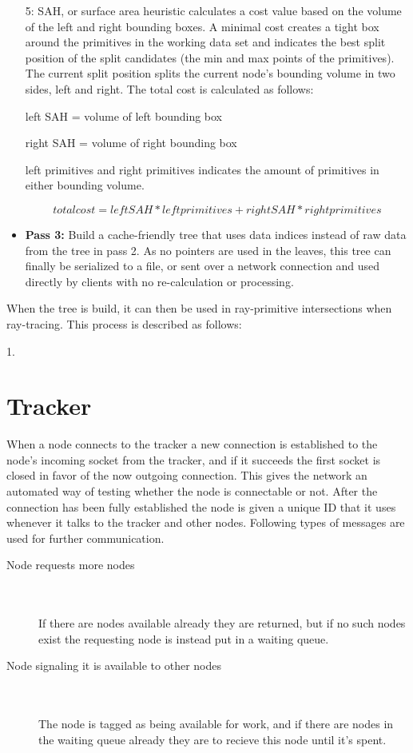 \begin{itemize}
  5: SAH, or surface area heuristic calculates a cost value based on the volume of the left and right bounding boxes. A minimal cost creates a tight box around the primitives in the working data set and indicates the best split position of the split candidates (the min and max points of the primitives). The current split position splits the current node's bounding volume in two sides, left and right. The total cost is calculated as follows: 

  left SAH = volume of left bounding box

  right SAH = volume of right bounding box

  left primitives and right primitives indicates the amount of primitives in either bounding volume.

  \begin{equation}
  total cost = left SAH * left primitives + right SAH * right primitives
  \end{equation}

  \item \textbf{Pass 3:} Build a cache-friendly tree that uses data indices instead of raw data from the tree in pass 2. As no pointers are used in the leaves, this tree can finally be serialized to a file, or sent over a network connection and used directly by clients with no re-calculation or processing.
\end{itemize}

When the tree is build, it can then be used in ray-primitive intersections when ray-tracing. This process is described as follows:

1. 

\section{Tracker}
When a node connects to the tracker a new connection is established to the node's incoming socket from the tracker, and if it succeeds the first socket is closed in favor of the now outgoing connection.
This gives the network an automated way of testing whether the node is connectable or not.
After the connection has been fully established the node is given a unique ID that it uses whenever it talks to the tracker and other nodes.
Following types of messages are used for further communication.

\begin{description}
\item[Node requests more nodes] \hfill \\\\
If there are nodes available already they are returned, but if no such nodes exist the requesting node is instead put in a waiting queue.
\item[Node signaling it is available to other nodes] \hfill \\\\
The node is tagged as being available for work, and if there are nodes in the waiting queue already they are to recieve this node until it's spent.
\end{description}


